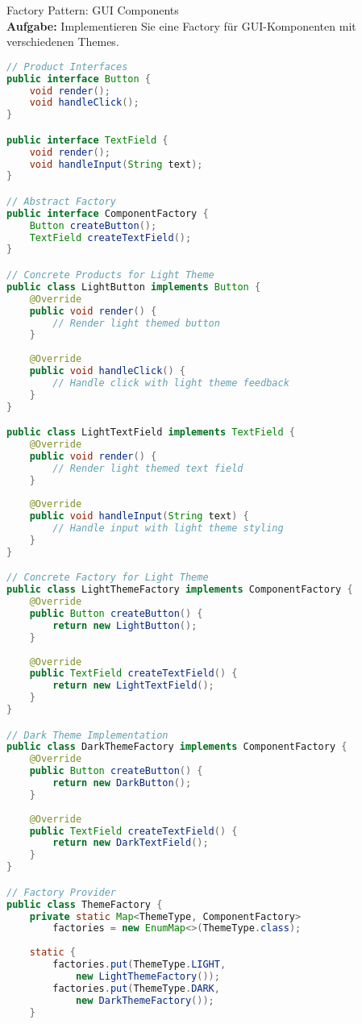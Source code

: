 \begin{example2}[breakable]{Factory Pattern: GUI Components}\\
\textbf{Aufgabe:} Implementieren Sie eine Factory für GUI-Komponenten mit verschiedenen Themes.

\begin{lstlisting}[language=Java, style=basesmol]
// Product Interfaces
public interface Button {
    void render();
    void handleClick();
}

public interface TextField {
    void render();
    void handleInput(String text);
}

// Abstract Factory
public interface ComponentFactory {
    Button createButton();
    TextField createTextField();
}

// Concrete Products for Light Theme
public class LightButton implements Button {
    @Override
    public void render() {
        // Render light themed button
    }
    
    @Override
    public void handleClick() {
        // Handle click with light theme feedback
    }
}

public class LightTextField implements TextField {
    @Override
    public void render() {
        // Render light themed text field
    }
    
    @Override
    public void handleInput(String text) {
        // Handle input with light theme styling
    }
}

// Concrete Factory for Light Theme
public class LightThemeFactory implements ComponentFactory {
    @Override
    public Button createButton() {
        return new LightButton();
    }
    
    @Override
    public TextField createTextField() {
        return new LightTextField();
    }
}

// Dark Theme Implementation
public class DarkThemeFactory implements ComponentFactory {
    @Override
    public Button createButton() {
        return new DarkButton();
    }
    
    @Override
    public TextField createTextField() {
        return new DarkTextField();
    }
}

// Factory Provider
public class ThemeFactory {
    private static Map<ThemeType, ComponentFactory> 
        factories = new EnumMap<>(ThemeType.class);
        
    static {
        factories.put(ThemeType.LIGHT, 
            new LightThemeFactory());
        factories.put(ThemeType.DARK, 
            new DarkThemeFactory());
    }
    

\end{lstlisting}
\end{example2}
